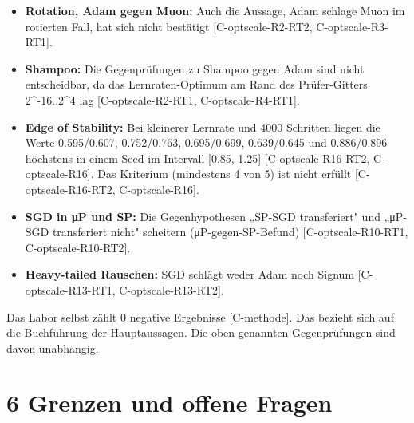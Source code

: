 \documentclass[10pt,twocolumn]{article}
\begin{document}
\begin{itemize}
\item \textbf{Rotation, Adam gegen Muon:} Auch die Aussage, Adam schlage Muon im rotierten Fall, hat sich nicht bestätigt {\scriptsize[C-optscale-R2-RT2, C-optscale-R3-RT1]}.
\item \textbf{Shampoo:} Die Gegenprüfungen zu Shampoo gegen Adam sind nicht entscheidbar, da das Lernraten-Optimum am Rand des Prüfer-Gitters 2^-16..2^4 lag {\scriptsize[C-optscale-R2-RT1, C-optscale-R4-RT1]}.
\item \textbf{Edge of Stability:} Bei kleinerer Lernrate und 4000 Schritten liegen die Werte 0.595/0.607, 0.752/0.763, 0.695/0.699, 0.639/0.645 und 0.886/0.896 höchstens in einem Seed im Intervall [0.85, 1.25] {\scriptsize[C-optscale-R16-RT2, C-optscale-R16]}. Das Kriterium (mindestens 4 von 5) ist nicht erfüllt {\scriptsize[C-optscale-R16-RT2, C-optscale-R16]}.
\item \textbf{SGD in μP und SP:} Die Gegenhypothesen „SP-SGD transferiert" und „μP-SGD transferiert nicht" scheitern (μP-gegen-SP-Befund) {\scriptsize[C-optscale-R10-RT1, C-optscale-R10-RT2]}.
\item \textbf{Heavy-tailed Rauschen:} SGD schlägt weder Adam noch Signum {\scriptsize[C-optscale-R13-RT1, C-optscale-R13-RT2]}.
\end{itemize}

Das Labor selbst zählt 0 negative Ergebnisse {\scriptsize[C-methode]}. Das bezieht sich auf die Buchführung der Hauptaussagen. Die oben genannten Gegenprüfungen sind davon unabhängig.

\section{6 Grenzen und offene Fragen}
\end{document}

